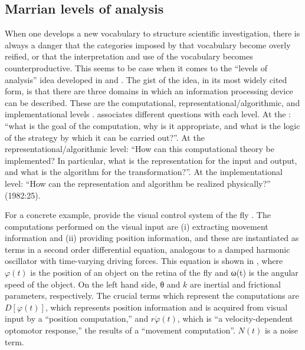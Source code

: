 \subsection{Marrian levels of analysis}

When one develops a new vocabulary to structure scientific investigation, there is always a danger that the categories imposed by that vocabulary become overly reified, or that the interpretation and use of the vocabulary becomes counterproductive. This seems to be case when it comes to the “levels of analysis” idea developed in \citet{Marr1982} and \citet{MarrPoggio1977}. The gist of the idea, in its most widely cited form, is that there are three domains in which an information processing device can be described. These are the computational, representational/algorithmic, and implementational levels \citep{Marr1982}. \citet{Marr1982} associates different questions with each level. At the : “what is the goal of the computation, why is it appropriate, and what is the logic of the strategy by which it can be carried out?”. At the representational/algorithmic level: “How can this computational theory be implemented? In particular, what is the representation for the input and output, and what is the algorithm for the transformation?”. At the implementational level: “How  can the representation and algorithm be realized physically?” (1982:25).

  For a concrete example, \citet{MarrPoggio1977} provide the visual control system of the fly \citep{ReichardtPoggio1976}. The computations performed on the visual input are (i) extracting movement information and (ii) providing position information, and these are instantiated as terms in a second order differential equation, analogous to a damped harmonic oscillator with time-varying driving forces. This equation is shown in , where  $\varphi(t)$ is the position of an object on the retina of the fly and ω(t) is the angular speed of the object. On the left hand side, θ and $k$ are inertial and frictional parameters, respectively. The crucial terms which represent the computations are  $D\left[\varphi \left(t\right)\right]$, which represents position information and is acquired from visual input by a “position computation,” and  $r\Dot{{\varphi} }\left(t\right)$, which is “a velocity-dependent optomotor response,” the results of a “movement computation”. $N(t)$ is a noise term.


